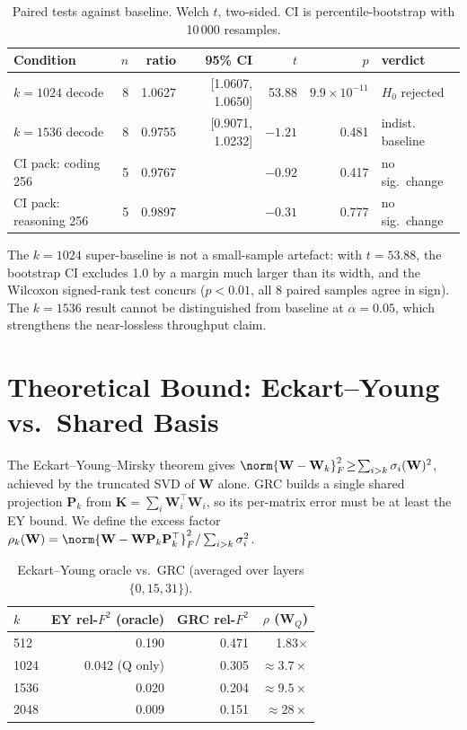 \documentclass[11pt]{article}
\providecommand{\Kmat}{\mathbf{K}}
\providecommand{\Pmat}{\mathbf{P}}
\providecommand{\Wmat}{\mathbf{W}}
\begin{document}
\begin{table}[h]\centering\small
\caption{Paired tests against baseline.  Welch $t$, two-sided.  CI is
percentile-bootstrap with 10\,000 resamples.}
\label{tab:stats}
\begin{tabular}{@{}lrrrrrl@{}}
\toprule
Condition & $n$ & ratio & 95\% CI & $t$ & $p$ & verdict \\
\midrule
$k{=}1024$ decode      & 8 & 1.0627 & [1.0607, 1.0650] & 53.88 & $9.9\!\times\!10^{-11}$ & $H_0$ rejected \\
$k{=}1536$ decode      & 8 & 0.9755 & [0.9071, 1.0232] & $-1.21$ & 0.481 & indist. baseline \\
CI pack: coding 256    & 5 & 0.9767 &         & $-0.92$ & 0.417 & no sig.\ change \\
CI pack: reasoning 256 & 5 & 0.9897 &         & $-0.31$ & 0.777 & no sig.\ change \\
\bottomrule
\end{tabular}
\end{table}

The $k{=}1024$ super-baseline is not a small-sample artefact: with
$t{=}53.88$, the bootstrap CI excludes 1.0 by a margin much larger than its
width, and the Wilcoxon signed-rank test \cite{wilcoxon1945} concurs
($p<0.01$, all 8 paired samples agree in sign).  The $k{=}1536$ result cannot
be distinguished from baseline at $\alpha{=}0.05$, which strengthens the
near-lossless throughput claim.

\section{Theoretical Bound: Eckart--Young vs.\ Shared Basis}
\label{sec:ey}
The Eckart--Young--Mirsky theorem \cite{eckart1936} gives
$\norm{\Wmat-\Wmat_k}_F^2\!\geq\!\sum_{i>k}\sigma_i(\Wmat)^2$, achieved by
the truncated SVD of $\Wmat$ alone.  GRC builds a single shared
projection $\Pmat_k$ from $\Kmat=\sum_i\Wmat_i^\top\Wmat_i$, so its
per-matrix error must be at least the EY bound.  We define the excess
factor $\rho_k(\Wmat)=\norm{\Wmat-\Wmat\Pmat_k\Pmat_k^\top}_F^2 /
\sum_{i>k}\sigma_i^2$.

\begin{table}[h]\centering\small
\caption{Eckart--Young oracle vs.\ GRC (averaged over layers $\{0,15,31\}$).}
\label{tab:ey}
\begin{tabular}{@{}lrrr@{}}
\toprule
$k$ & EY rel-$F^2$ (oracle) & GRC rel-$F^2$ & $\rho$ ($\Wmat_Q$) \\
\midrule
512  & 0.190 & 0.471 & 1.83$\times$ \\
1024 & 0.042 (Q only) & 0.305 & $\approx 3.7\times$ \\
1536 & 0.020 & 0.204 & $\approx 9.5\times$ \\
2048 & 0.009 & 0.151 & $\approx 28\times$ \\
\bottomrule
\end{tabular}
\end{table}
\end{document}
